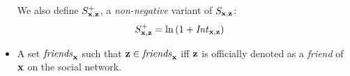 \begin{itemize}
We also define $S^+_{\mathbf{x},\mathbf{z}}$, a \emph{non-negative} 
variant of $S_{\mathbf{x},\mathbf{z}}$:
\begin{align}
S^+_{\mathbf{x},\mathbf{z}} & = \ln \left( 1 + \mathit{Int}_{\mathbf{x},\mathbf{z}} \right)
\end{align}
\item A set $\mathit{friends}_{\mathbf{x}}$ such that $\mathbf{z} \in \mathit{friends}_{\mathbf{x}}$
iff $\mathbf{z}$ is officially denoted as a \emph{friend} of $\mathbf{x}$ 
on the social network.
\end{itemize}

%

%
%

